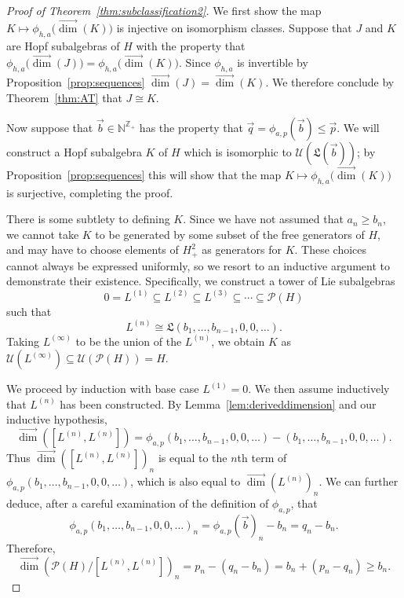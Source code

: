 \documentclass[11pt]{amsart}
\theoremstyle{definition}
\numberwithin{equation}{section}
\def\NN{{\mathbb N}}
\def\ZZ{{\mathbb Z}}
\newcommand{\vecdim}{\overrightarrow{\dim}}
\begin{document}
\begin{proof}[Proof of Theorem~\ref{thm:subclassification2}]
We first show the map $K \mapsto \phi_{h, a} \big( \vecdim(K)\big)$ is injective on isomorphism classes.  Suppose that $J$ and $K$ are Hopf subalgebras of $H$ with the property that $\phi_{h, a} \big(\vecdim(J)) = \phi_{h, a} \big(\vecdim(K))$.  
Since $\phi_{h, a}$ is invertible by Proposition~\ref{prop:sequences} $\vecdim(J) = \vecdim(K)$.  We therefore conclude by Theorem~\ref{thm:AT} that $J \cong K$.

Now suppose that $\vec{b} \in \NN^{\ZZ_{+}}$ has the property that $\vec{q} = \phi_{a, p}(\vec{b}) \le \vec{p}$.  
We will construct a Hopf subalgebra $K$ of $H$ which is isomorphic to $\mathcal{U}(\mathfrak{L}(\vec{b}))$; by Proposition~\ref{prop:sequences} this will show that the  map $K \mapsto \phi_{h, a} \big( \vecdim(K)\big)$ is surjective, completing the proof.

There is some subtlety to defining $K$.  Since we have not assumed that $a_{n} \ge b_{n}$, we cannot take $K$ to be generated by some subset of the free generators of $H$, and may have to choose elements of $H^{2}_{+}$ as generators for $K$.  
These choices cannot always be expressed uniformly, so we resort to an inductive argument to demonstrate their existence.  
Specifically, we construct a tower of Lie subalgebras 
\[
0 = L^{(1)} \subseteq L^{(2)} \subseteq L^{(3)} \subseteq \cdots \subseteq \mathcal{P}(H)
\]
such that 
\[
L^{(n)} \cong \mathfrak{L}(b_{1}, \ldots, b_{n-1}, 0, 0, \ldots).
\]
Taking $L^{(\infty)}$ to be the union of the $L^{(n)}$, we obtain $K$ as $\mathcal{U}(L^{(\infty)}) \subseteq \mathcal{U}(\mathcal{P}(H)) = H$.

We proceed by induction with base case $L^{(1)} = 0$.  
We then assume inductively that $L^{(n)}$ has been constructed.  
By Lemma~\ref{lem:deriveddimension} and our inductive hypothesis,
\[
\vecdim([L^{(n)}, L^{(n)}])
 = 
\phi_{a, p}(b_{1}, \ldots, b_{n-1}, 0, 0, \ldots) - (b_{1}, \ldots, b_{n-1}, 0, 0, \ldots).
\]
Thus $\vecdim([L^{(n)}, L^{(n)}])_{n}$ is equal to the $n$th term of $\phi_{a, p}(b_{1}, \ldots, b_{n-1}, 0, 0, \ldots)$, which is also equal to $\vecdim(L^{(n)})_{n}$.  
We can further deduce, after a careful examination of the definition of $\phi_{a, p}$, that
\begin{equation}
\label{eq:inductivedimensionequality}
\phi_{a, p}(b_{1}, \ldots, b_{n-1}, 0, 0, \ldots)_{n}
=
\phi_{a, p}(\vec{b})_{n} - b_{n}
=
q_{n} - b_{n}.
\end{equation}
Therefore,
\[
\vecdim\left( \mathcal{P}(H) \big/ [L^{(n)}, L^{(n)}] \right)_{n}
= p_{n} - (q_{n} - b_{n})
= b_{n} + (p_{n} - q_{n})
\ge b_{n}.
\]


\end{proof}
\end{document}

